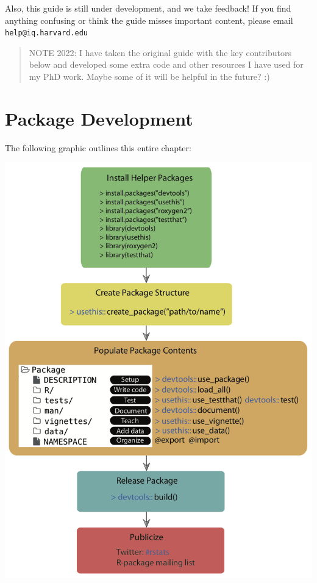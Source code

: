 \documentclass[
]{book}
\begin{document}
Also, this guide is still under development, and we take feedback! If you find anything confusing or think the guide misses important content, please email \texttt{help@iq.harvard.edu}

\begin{quote}
NOTE 2022: I have taken the original guide with the key contributors below and developed some extra code and other resources I have used for my PhD work. Maybe some of it will be helpful in the future? :)
\end{quote}

\hypertarget{package-development}{%
\chapter{Package Development}\label{package-development}}

The following graphic outlines this entire chapter:

\includegraphics{images/package_workflow2.png}
\end{document}
